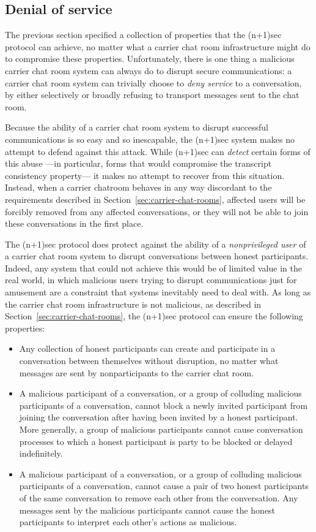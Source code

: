 \documentclass{article}
\begin{document}
\subsection{Denial of service}
\label{sec:chat-model/denial-of-service}

The previous section specified a collection of properties that the (n+1)sec protocol can achieve, no matter what a carrier chat room infrastructure might do to compromise these properties.
Unfortunately, there is one thing a malicious carrier chat room system can always do to disrupt secure communications: a carrier chat room system can trivially choose to \emph{deny service} to a conversation, by either selectively or broadly refusing to transport messages sent to the chat room.

Because the ability of a carrier chat room system to disrupt successful communications is so easy and so inescapable, the (n+1)sec system makes no attempt to defend against this attack.
While (n+1)sec can \emph{detect} certain forms of this abuse ---in particular, forms that would compromise the transcript consistency property--- it makes no attempt to recover from this situation.
Instead, when a carrier chatroom behaves in any way discordant to the requirements described in Section~\ref{sec:carrier-chat-rooms}, affected users will be forcibly removed from any affected conversations, or they will not be able to join these conversations in the first place.

The (n+1)sec protocol does protect against the ability of a \emph{nonprivileged user} of a carrier chat room system to disrupt conversations between honest participants.
Indeed, any system that could not achieve this would be of limited value in the real world, in which malicious users trying to disrupt communications just for amusement are a constraint that systems inevitably need to deal with.
As long as the carrier chat room infrastructure is not malicious, as described in Section~\ref{sec:carrier-chat-rooms}, the (n+1)sec protocol can ensure the following properties:
\begin{itemize}
\item Any collection of honest participants can create and participate in a conversation between themselves without disruption, no matter what messages are sent by nonparticipants to the carrier chat room.
\item A malicious participant of a conversation, or a group of colluding malicious participants of a conversation, cannot block a newly invited participant from joining the conversation after having been invited by a honest participant. More generally, a group of malicious participants cannot cause conversation processes to which a honest participant is party to be blocked or delayed indefinitely.
\item A malicious participant of a conversation, or a group of colluding malicious participants of a conversation, cannot cause a pair of two honest participants of the same conversation to remove each other from the conversation. Any messages sent by the malicious participants cannot cause the honest participants to interpret each other's actions as malicious.
\end{itemize}
\end{document}
